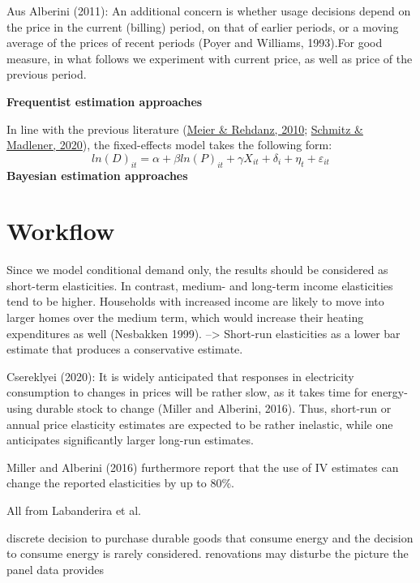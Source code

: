 \documentclass[12pt,twoside]{reedthesis}
\begin{document}
Aus Alberini (2011):
An additional concern is whether usage decisions depend on the price in the current (billing) period, on that of earlier periods, or a moving average of the prices of recent periods (Poyer and Williams, 1993).For good measure, in what follows we experiment with current price, as well as price of the previous period.

\textbf{Frequentist estimation approaches}

In line with the previous literature (\protect\hyperlink{ref-meier_rehdanz10}{Meier \& Rehdanz, 2010}; \protect\hyperlink{ref-schmitz_madlener20}{Schmitz \& Madlener, 2020}), the fixed-effects model takes the following form:
\begin{equation}
ln(D)_{it} = \alpha + \beta ln(P)_{it} + \gamma X_{it} + \delta_i + \eta_t + \varepsilon_{it}
\label{eq:fixedeff}
\end{equation}
\textbf{Bayesian estimation approaches}

\hypertarget{workflow}{%
\section{Workflow}\label{workflow}}

Since we model conditional demand only, the results should be considered as short-term elasticities. In contrast, medium- and long-term income elasticities tend to be higher. Households with increased income are likely to move into larger homes over the medium term, which would increase their heating expenditures as well (Nesbakken 1999). --\textgreater{} Short-run elasticities as a lower bar estimate that produces a conservative estimate.

Csereklyei (2020):
It is widely anticipated that responses in electricity consumption to changes in prices will be rather slow, as it takes time for energy-using durable stock to change (Miller and Alberini, 2016). Thus, short-run or annual price elasticity estimates are expected to be rather inelastic, while one anticipates significantly larger long-run estimates.

Miller and Alberini (2016) furthermore report that the use of IV estimates can change the reported elasticities by up to 80\%.

All from Labanderira et al.

discrete decision to purchase durable goods that consume energy and the decision to consume energy is rarely considered.
renovations may disturbe the picture the panel data provides
\end{document}
